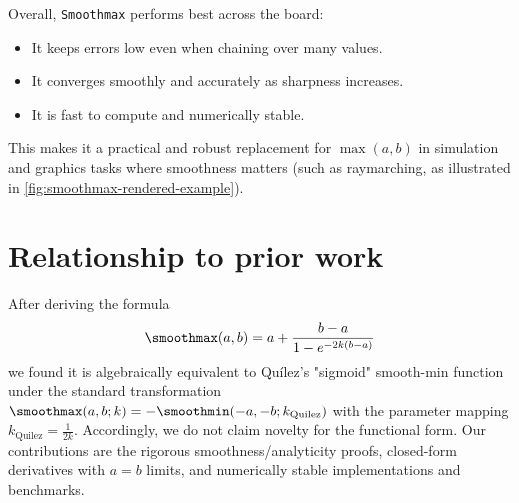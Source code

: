 Overall, \texttt{Smoothmax} performs best across the board:
\begin{itemize}
    \item It keeps errors low even when chaining over many values.
    \item It converges smoothly and accurately as sharpness increases.
    \item It is fast to compute and numerically stable.
\end{itemize}

This makes it a practical and robust replacement for $\max(a, b)$ in simulation and graphics tasks where smoothness matters (such as raymarching, as illustrated in \cref{fig:smoothmax-rendered-example}).

\section{Relationship to prior work}

After deriving the formula
\begin{align}
    \smoothmax(a,b) = a + \frac{b - a}{1-e^{-2k(b - a)}}
\end{align}
we found it is algebraically equivalent to Quílez's "sigmoid" smooth-min function \cite{Quilez2013} under the standard transformation $\smoothmax(a,b; k) = -\smoothmin(-a,-b;k_\text{Quilez})$ with the parameter mapping $k_\text{Quilez} = \frac{1}{2k}$. Accordingly, we do not claim novelty for the functional form. Our contributions are the rigorous smoothness/analyticity proofs, closed-form derivatives with $a = b$ limits, and numerically stable implementations and benchmarks.
